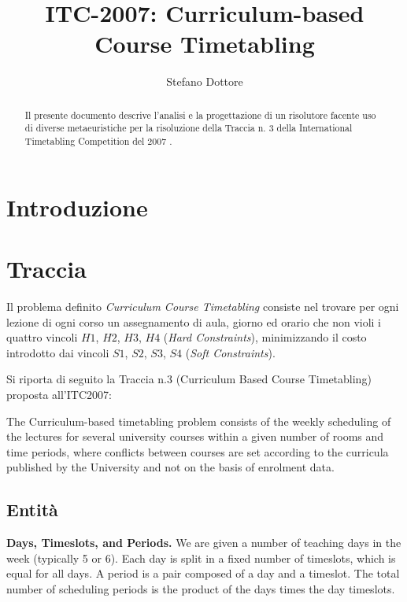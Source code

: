 \documentclass[]{article}
\title{ITC-2007: Curriculum-based Course Timetabling}
\author{Stefano Dottore}
\begin{document}
\maketitle

\begin{abstract}

Il presente documento descrive l'analisi e la progettazione di un risolutore facente uso di diverse metaeuristiche per la risoluzione della Traccia n. 3 della International Timetabling Competition del 2007 \cite{bib:itc2007}.

\end{abstract}

\section{Introduzione}

\section{Traccia}
Il problema definito \textit{Curriculum Course Timetabling} consiste nel trovare per ogni lezione di ogni corso un assegnamento di aula, giorno ed orario che non violi i quattro vincoli $H1$, $H2$, $H3$, $H4$ (\textit{Hard Constraints}), minimizzando il costo introdotto dai vincoli $S1$, $S2$, $S3$, $S4$ (\textit{Soft Constraints}).

Si riporta di seguito la Traccia n.3 (Curriculum Based Course Timetabling)  proposta all'ITC2007:

\vspace{10pt}
\noindent
The Curriculum-based timetabling problem consists of the weekly scheduling of the lectures
for several university courses within a given number of rooms and time periods, where conflicts
between courses are set according to the curricula published by the University and not on the
basis of enrolment data.

\subsection{Entità}

\textbf{Days, Timeslots, and Periods.} We are given a number of teaching days in the week (typically 5 or 6). 
Each day is split in a fixed number of timeslots, which is equal for all days.
A period is a pair composed of a day and a timeslot. The total number of 
scheduling periods is the product of the days times the day timeslots.
\end{document}
